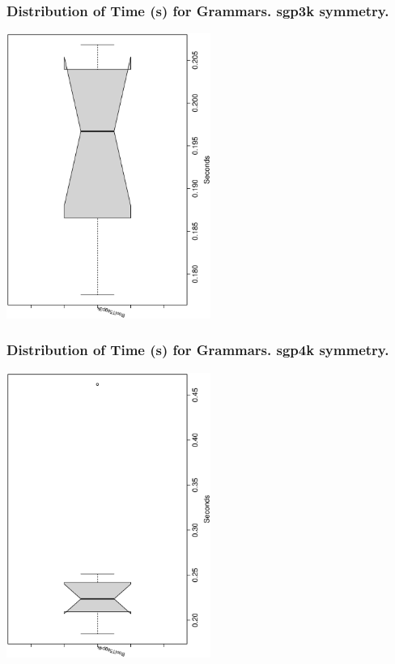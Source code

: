 \documentclass[18pt,c]{beamer}
\begin{document}
 \begin{frame}
 \frametitle{ Distribution of Time (s) for Grammars. sgp3k  symmetry. }
 \begin{center}
\includegraphics[width=0.5\textwidth, angle=-90]
{ExpFboxplottSeconds001.eps}
 \end{center}
 \label{ExpFboxplottSeconds001.eps}  
 \end{frame}

 \begin{frame}
 \frametitle{ Distribution of Time (s) for Grammars. sgp4k  symmetry. }
 \begin{center}
\includegraphics[width=0.5\textwidth, angle=-90]
{ExpFboxplottSeconds002.eps}
 \end{center}
 \label{ExpFboxplottSeconds002.eps}  
 \end{frame}
\end{document}
